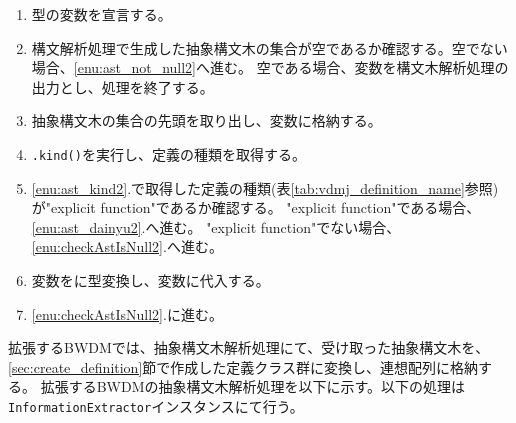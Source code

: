 \documentclass[uplatex, report, a4j, 10pt]{jsbook}
\newcommand\ttt[1]{\texttt{#1}}
\begin{document}

\begin{enumerate}
  \item \TCExplicitFunctionDefinition{}型の変数\tcFunctionDefinition{}を宣言する。
  \item\label{enu:checkAstIsNull2} 構文解析処理で生成した抽象構文木の集合が空であるか確認する。空でない場合、\ref{enu:ast_not_null2}へ進む。
        空である場合、変数\tcFunctionDefinition{}を構文木解析処理の出力とし、処理を終了する。
  \item\label{enu:ast_not_null2} 抽象構文木の集合の先頭を取り出し、変数\astDefinition{}に格納する。
  \item\label{enu:ast_kind2} \astDefinition{}\ttt{.kind()}を実行し、定義の種類を取得する。
  \item \ref{enu:ast_kind2}.で取得した定義の種類(表\ref{tab:vdmj_definition_name}参照)が"explicit function"であるか確認する。
        "explicit function"である場合、\ref{enu:ast_dainyu2}.へ進む。
        "explicit function"でない場合、\ref{enu:checkAstIsNull2}.へ進む。
  \item\label{enu:ast_dainyu2} 変数\astDefinition{}を\TCExplicitFunctionDefinition{}に型変換し、変数\tcFunctionDefinition{}に代入する。
  \item \ref{enu:checkAstIsNull2}.に進む。
\end{enumerate}


拡張するBWDMでは、抽象構文木解析処理にて、受け取った抽象構文木を、\ref{sec:create_definition}節で作成した定義クラス群に変換し、連想配列に格納する。
拡張するBWDMの抽象構文木解析処理を以下に示す。以下の処理は\ttt{InformationExtractor}インスタンスにて行う。
\end{document}

